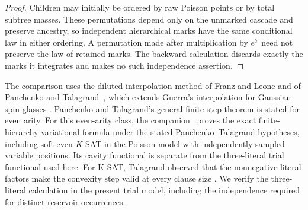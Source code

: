 \begin{proof}
Children may initially be ordered by raw Poisson points or by total subtree
masses.  These permutations depend only on the unmarked cascade and preserve
ancestry, so independent hierarchical marks have the same conditional law
in either ordering.  A permutation made after multiplication by $e^Y$ need
not preserve the law of retained marks.  The backward calculation discards
exactly the marks it integrates and makes no such independence assertion.
\end{proof}

The comparison uses the diluted interpolation method of Franz and Leone
and of Panchenko and Talagrand~\cite{FranzLeone2003,PanchenkoTalagrand2004},
which extends Guerra's interpolation for Gaussian spin glasses
\cite[arXiv version, Theorems~3 and~5]{Guerra2003}.
Panchenko and Talagrand's general finite-step theorem is stated for even
arity.
For this even-arity class, the companion~\cite[Theorem~2.1 and Corollary~10.2]{OpenAIDilutedPressure2026}
proves the exact finite-hierarchy variational formula under the stated
Panchenko--Talagrand hypotheses, including soft even-$K$ SAT in the Poisson
model with independently sampled variable positions.
Its cavity functional is separate from the three-literal trial functional used here.  For K-SAT, Talagrand observed that the nonnegative literal factors
make the convexity step valid at every clause size
\cite[author manuscript, Section~6.5, Equations~(6.120) and~(6.129)]{Talagrand2011MF1}.
We verify the three-literal calculation in the present trial model,
including the independence required for distinct reservoir occurrences.

